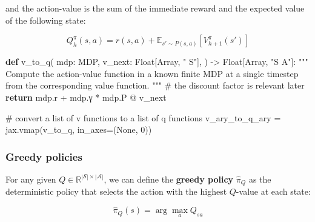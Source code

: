 \documentclass[
  letterpaper,
  DIV=11,
  numbers=noendperiod]{scrreprt}
\newenvironment{Shaded}{\begin{snugshade}}{\end{snugshade}}
\newcommand{\CommentTok}[1]{\textcolor[rgb]{0.37,0.37,0.37}{#1}}
\newcommand{\ControlFlowTok}[1]{\textcolor[rgb]{0.00,0.23,0.31}{\textbf{#1}}}
\newcommand{\DecValTok}[1]{\textcolor[rgb]{0.68,0.00,0.00}{#1}}
\newcommand{\KeywordTok}[1]{\textcolor[rgb]{0.00,0.23,0.31}{\textbf{#1}}}
\newcommand{\NormalTok}[1]{\textcolor[rgb]{0.00,0.23,0.31}{#1}}
\newcommand{\OperatorTok}[1]{\textcolor[rgb]{0.37,0.37,0.37}{#1}}
\newcommand{\StringTok}[1]{\textcolor[rgb]{0.13,0.47,0.30}{#1}}
\newcommand{\VariableTok}[1]{\textcolor[rgb]{0.07,0.07,0.07}{#1}}
\theoremstyle{plain}
\theoremstyle{plain}
\theoremstyle{definition}
\theoremstyle{definition}
\theoremstyle{remark}
\begin{document}
and the action-value is the sum of the immediate reward and the expected
value of the following state:

\[Q_h^\pi(s, a) = r(s, a) + \mathbb{E}_{s' \sim P(s, a)} [V_{h+1}^\pi(s')]\]

\begin{Shaded}
\begin{Highlighting}[]
\KeywordTok{def}\NormalTok{ v\_to\_q(}
\NormalTok{    mdp: MDP,}
\NormalTok{    v\_next: Float[Array, }\StringTok{" S"}\NormalTok{],}
\NormalTok{) }\OperatorTok{{-}\textgreater{}}\NormalTok{ Float[Array, }\StringTok{"S A"}\NormalTok{]:}
    \CommentTok{"""}
\CommentTok{    Compute the action{-}value function in a known finite MDP}
\CommentTok{    at a single timestep from the corresponding value function.}
\CommentTok{    """}
    \CommentTok{\# the discount factor is relevant later}
    \ControlFlowTok{return}\NormalTok{ mdp.r }\OperatorTok{+}\NormalTok{ mdp.γ }\OperatorTok{*}\NormalTok{ mdp.P }\OperatorTok{@}\NormalTok{ v\_next}


\CommentTok{\# convert a list of v functions to a list of q functions}
\NormalTok{v\_ary\_to\_q\_ary }\OperatorTok{=}\NormalTok{ jax.vmap(v\_to\_q, in\_axes}\OperatorTok{=}\NormalTok{(}\VariableTok{None}\NormalTok{, }\DecValTok{0}\NormalTok{))}
\end{Highlighting}
\end{Shaded}

\subsubsection{Greedy policies}\label{greedy-policies}

For any given \(Q \in \mathbb{R}^{|\mathcal{S}| \times |\mathcal{A}|}\),
we can define the \textbf{greedy policy} \(\hat \pi_Q\) as the
deterministic policy that selects the action with the highest
\(Q\)-value at each state:

\[
\hat \pi_Q(s) = \arg\max_{a} Q_{sa}
\]
\end{document}
